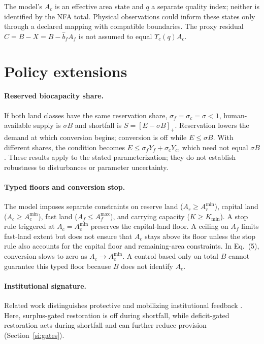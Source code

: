 \documentclass[11pt,a4paper]{article}
\newcommand{\Ups}{\Upsilon_c}
\newcommand{\Acmin}{A_c^{\min}}
\begin{document}
The model's $A_c$ is an effective area state and $q$ a separate quality index; neither is identified by the NFA total. Physical observations could inform these states only through a declared mapping with compatible boundaries. The proxy residual $C=B-X=B-\hat b_fA_f$ is not assumed to equal $\Ups(q)A_c$.
\section{Policy extensions}\label{si:policy}

\paragraph{Reserved biocapacity share.} If both land classes have the same reservation share, $\sigma_f=\sigma_c=\sigma<1$, human-available supply is $\sigma B$ and shortfall is $S=[E-\sigma B]_+$. Reservation lowers the demand at which conversion begins; conversion is off while $E\le\sigma B$. With different shares, the condition becomes $E\le\sigma_fY_f+\sigma_cY_c$, which need not equal $\sigma B$. These results apply to the stated parameterization; they do not establish robustness to disturbances or parameter uncertainty.

\paragraph{Typed floors and conversion stop.} The model imposes separate constraints on reserve land ($A_r\ge A_r^{\min}$), capital land ($A_c\ge\Acmin$), fast land ($A_f\le A_f^{\max}$), and carrying capacity ($K\ge K_{\min}$). A stop rule triggered at $A_c=\Acmin$ preserves the capital-land floor. A ceiling on $A_f$ limits fast-land extent but does not ensure that $A_c$ stays above its floor unless the stop rule also accounts for the capital floor and remaining-area constraints. In Eq.~(5), conversion slows to zero as $A_c\to\Acmin$. A control based only on total $B$ cannot guarantee this typed floor because $B$ does not identify $A_c$.

\paragraph{Institutional signature.} Related work distinguishes protective and mobilizing institutional feedback \citep{Abaee2026a}. Here, surplus-gated restoration is off during shortfall, while deficit-gated restoration acts during shortfall and can further reduce provision (Section~\ref{si:gates}).
\end{document}
